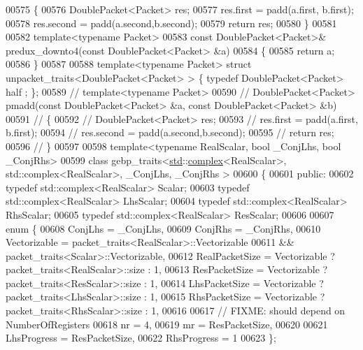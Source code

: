 \begin{DoxyCode}
00575 \{
00576   DoublePacket<Packet> res;
00577   res.first  = padd(a.first, b.first);
00578   res.second = padd(a.second,b.second);
00579   \textcolor{keywordflow}{return} res;
00580 \}
00581 
00582 \textcolor{keyword}{template}<\textcolor{keyword}{typename} Packet>
00583 \textcolor{keyword}{const} DoublePacket<Packet>& predux\_downto4(\textcolor{keyword}{const} DoublePacket<Packet> &a)
00584 \{
00585   \textcolor{keywordflow}{return} a;
00586 \}
00587 
00588 \textcolor{keyword}{template}<\textcolor{keyword}{typename} Packet> \textcolor{keyword}{struct }unpacket\_traits<DoublePacket<Packet> > \{ \textcolor{keyword}{typedef} DoublePacket<Packet> half
      ; \};
00589 \textcolor{comment}{// template<typename Packet>}
00590 \textcolor{comment}{// DoublePacket<Packet> pmadd(const DoublePacket<Packet> &a, const DoublePacket<Packet> &b)}
00591 \textcolor{comment}{// \{}
00592 \textcolor{comment}{//   DoublePacket<Packet> res;}
00593 \textcolor{comment}{//   res.first  = padd(a.first, b.first);}
00594 \textcolor{comment}{//   res.second = padd(a.second,b.second);}
00595 \textcolor{comment}{//   return res;}
00596 \textcolor{comment}{// \}}
00597 
00598 \textcolor{keyword}{template}<\textcolor{keyword}{typename} RealScalar, \textcolor{keywordtype}{bool} \_ConjLhs, \textcolor{keywordtype}{bool} \_ConjRhs>
00599 \textcolor{keyword}{class }gebp\_traits<\hyperlink{namespacestd}{std}::\hyperlink{structcomplex}{complex}<RealScalar>, std::complex<RealScalar>, \_ConjLhs, \_ConjRhs >
00600 \{
00601 \textcolor{keyword}{public}:
00602   \textcolor{keyword}{typedef} std::complex<RealScalar>  Scalar;
00603   \textcolor{keyword}{typedef} std::complex<RealScalar>  LhsScalar;
00604   \textcolor{keyword}{typedef} std::complex<RealScalar>  RhsScalar;
00605   \textcolor{keyword}{typedef} std::complex<RealScalar>  ResScalar;
00606   
00607   \textcolor{keyword}{enum} \{
00608     ConjLhs = \_ConjLhs,
00609     ConjRhs = \_ConjRhs,
00610     Vectorizable = packet\_traits<RealScalar>::Vectorizable
00611                 && packet\_traits<Scalar>::Vectorizable,
00612     RealPacketSize  = Vectorizable ? packet\_traits<RealScalar>::size : 1,
00613     ResPacketSize   = Vectorizable ? packet\_traits<ResScalar>::size : 1,
00614     LhsPacketSize = Vectorizable ? packet\_traits<LhsScalar>::size : 1,
00615     RhsPacketSize = Vectorizable ? packet\_traits<RhsScalar>::size : 1,
00616 
00617     \textcolor{comment}{// FIXME: should depend on NumberOfRegisters}
00618     nr = 4,
00619     mr = ResPacketSize,
00620 
00621     LhsProgress = ResPacketSize,
00622     RhsProgress = 1
00623   \};

\end{DoxyCode}
